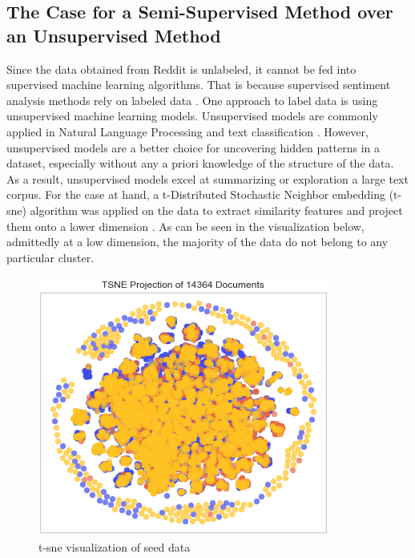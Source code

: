 \documentclass[11pt, a4paper]{article}
\begin{document}
\subsection{The Case for a Semi-Supervised Method over an Unsupervised Method} \label{subs:supervisedvsunsupervised}
Since the data obtained from Reddit is unlabeled, it cannot be fed into supervised machine learning algorithms. 
That is because supervised sentiment analysis methods rely on labeled data \citep{sazzed2021ssentia}. One approach to label 
data is using unsupervised machine learning models. Unsupervised models are commonly applied in Natural Language Processing 
and text classification \citep{jung2019automatedclassification}. However, unsupervised models are a better choice for uncovering hidden 
patterns in a dataset, especially without any a priori knowledge of the structure of the data. As a result, unsupervised models 
excel at summarizing or exploration a large text corpus. 
For the case at hand, a t-Distributed Stochastic Neighbor embedding (t-sne) algorithm was applied on the data to extract similarity 
features and project them onto a lower dimension \citep{binu2020dimreductiontsne}. As can be seen in the visualization below, admittedly 
at a low dimension, the majority of the data do not belong to any particular cluster.

\begin{figure}
    \centering
    \includegraphics[width=\textwidth]{tsne_projection.png}
    \caption{t-sne visualization of seed data}
    \label{fig:t-sne}
\end{figure}
\end{document}
